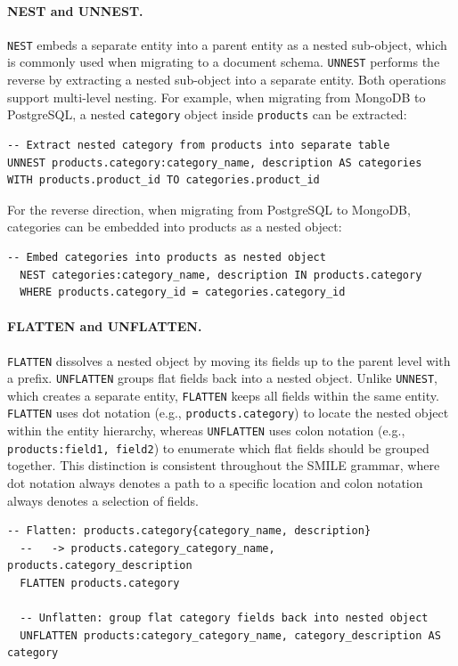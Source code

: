  \paragraph{NEST and UNNEST.}
  \texttt{NEST} embeds a separate entity into a parent entity as a nested sub-object, which is commonly used when migrating to a document schema. \texttt{UNNEST} performs the reverse by extracting a nested sub-object into a separate entity. Both operations support multi-level nesting. For
  example, when migrating from MongoDB to PostgreSQL, a nested \texttt{category} object inside \texttt{products} can be extracted:
  \begin{lstlisting}[basicstyle=\small\ttfamily]
  -- Extract nested category from products into separate table
UNNEST products.category:category_name, description AS categories
WITH products.product_id TO categories.product_id
  \end{lstlisting}

For the reverse direction, when migrating from PostgreSQL to MongoDB, categories can be embedded into products as a nested object:


  \begin{lstlisting}[basicstyle=\small\ttfamily]
  -- Embed categories into products as nested object
  NEST categories:category_name, description IN products.category
  WHERE products.category_id = categories.category_id
  \end{lstlisting}

\paragraph{FLATTEN and UNFLATTEN.}
  \texttt{FLATTEN} dissolves a nested object by moving its fields up to the parent level with a prefix. \texttt{UNFLATTEN} groups flat fields back
  into a nested object. Unlike \texttt{UNNEST}, which creates a separate entity, \texttt{FLATTEN} keeps all fields within the same entity.
  \texttt{FLATTEN} uses dot notation (e.g., \texttt{products.category}) to locate the nested object within the entity hierarchy, whereas
  \texttt{UNFLATTEN} uses colon notation (e.g., \texttt{products:field1, field2}) to enumerate which flat fields should be grouped together. This
  distinction is consistent throughout the SMILE grammar, where dot notation always denotes a path to a specific location and colon notation always
  denotes a selection of fields.
  \begin{lstlisting}[basicstyle=\small\ttfamily]
  -- Flatten: products.category{category_name, description}
  --   -> products.category_category_name, products.category_description
  FLATTEN products.category

  -- Unflatten: group flat category fields back into nested object
  UNFLATTEN products:category_category_name, category_description AS category
  \end{lstlisting}

